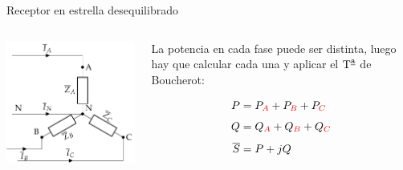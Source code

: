 \documentclass[aspectratio=169, usenames,svgnames,dvipsnames]{beamer}
\begin{document}
\begin{frame}{Receptor en estrella desequilibrado}
    \begin{columns}
    \begin{column}{0.5\columnwidth}
        \begin{center}
            \includegraphics[width=.9\linewidth]{../figs/EstrellaDesequilibrado_Receptor.pdf}
        \end{center}
    \end{column}
    
    \begin{column}{0.5\columnwidth}
    La \alert{potencia} en cada fase puede ser \alert{distinta}, luego hay que calcular cada una y aplicar el $\mbox{T}^{\textrm{\underline{a}}}$ de Boucherot:
    
        \begin{align*}
          P &= P_{\color{red}A} + P_{\color{red}B} + P_{\color{red}C}\\[4pt]
          Q &= Q_{\color{red}A} + Q_{\color{red}B} + Q_{\color{red}C}\\[4pt]
          \overline{S} &= P + jQ
        \end{align*}
    \end{column}
    \end{columns}
\end{frame}

\end{document}
